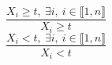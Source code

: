 $$\frac{X_{i} \geq t,~\exists i,~i \in \llbracket1,n\rrbracket}{X_{i} \geq t}$$ $$\frac{X_{i}<t,~\exists i,~i \in \llbracket1,n\rrbracket}{X_{i}<t}$$ 
